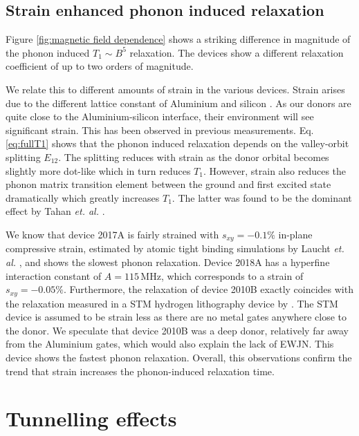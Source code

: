 \documentclass[%
 reprint,
 amsmath,amssymb,
 aps,
]{revtex4-1}
\begin{document}
\subsection{\label{sec:phonon} Strain enhanced phonon induced relaxation}

Figure \ref{fig:magnetic field dependence} shows a striking difference in magnitude of the phonon induced $T_1\sim B^5$ relaxation. The devices show a different relaxation coefficient of up to two orders of magnitude. 

We relate this to different amounts of strain in the various devices. Strain arises due to the different lattice constant of Aluminium and silicon \cite{Thorbeck2015}. As our donors are quite close to the Aluminium-silicon interface, their environment will see significant strain. This has been observed in previous measurements\cite{Laucht2015, Asaad2018}. 
Eq. \ref{eq:fullT1} shows that the phonon induced relaxation depends on the valley-orbit splitting $E_{12}$. The splitting reduces with strain as the donor orbital becomes slightly more dot-like \cite{Tahan2002} which in turn reduces $T_1$. However, strain also reduces the phonon matrix transition element between the ground and first excited state dramatically which greatly increases $T_1$. The latter was found to be the dominant effect by Tahan \textit{et. al.} \cite{Tahan2002}.  
 
We know that device 2017A is fairly strained with $s_{xy}=-0.1\%$ in-plane compressive strain, estimated by atomic tight binding simulations by Laucht \textit{et. al.} \cite{Laucht2015}, and shows the slowest phonon relaxation. Device 2018A has a hyperfine interaction constant of $A=115\,$MHz, which corresponds to a strain of $s_{xy}=-0.05\%$. Furthermore, the relaxation of device 2010B exactly coincides with the relaxation measured in a STM hydrogen lithography device by \cite{Watson2015}. The STM device is assumed to be strain less as there are no metal gates anywhere close to the donor. We speculate that device 2010B was a deep donor, relatively far away from the Aluminium gates, which would also explain the lack of EWJN. This device shows the fastest phonon relaxation. Overall, this observations confirm the trend that strain increases the phonon-induced relaxation time. 


\section{\label{sec:cotunnelling} Tunnelling effects}
\end{document}

